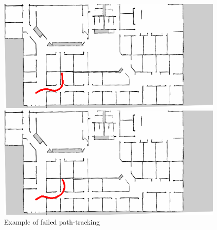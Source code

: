 \begin{figure}[h]
  \begin{minipage}[b]{0.45\linewidth}
    \centering
    \includegraphics[keepaspectratio, scale=0.35]{images/00_02_rename/traject9.png}
    \subcaption{}
  \end{minipage}
  \begin{minipage}[b]{0.45\linewidth}
    \centering
    \includegraphics[keepaspectratio, scale=0.35]{images/00_02_rename/traject28.png}
    \subcaption{}
  \end{minipage}
\caption{Example of failed path-tracking}
\label{Fig:fail4}
\end{figure}


